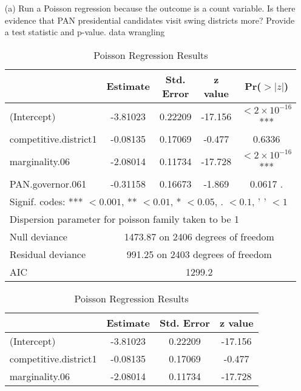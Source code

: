 \documentclass[12pt,letterpaper]{article}
\begin{document}
\begin{enumerate}
	\item [(a)]
	Run a Poisson regression because the outcome is a count variable. Is there evidence that PAN presidential candidates visit swing districts more? Provide a test statistic and p-value.
	data wrangling
	
	 
	\begin{table}[htbp]
		\centering
		\caption{Poisson Regression Results}
		\begin{tabular}{lcccc}
			\toprule
			& \textbf{Estimate} & \textbf{Std. Error} & \textbf{z value} & \textbf{Pr($>|z|$)} \\
			\midrule
			(Intercept) & -3.81023 & 0.22209 & -17.156 & $<2 \times 10^{-16}$ *** \\
			competitive.district1 & -0.08135 & 0.17069 & -0.477 & 0.6336 \\
			marginality.06 & -2.08014 & 0.11734 & -17.728 & $<2 \times 10^{-16}$ *** \\
			PAN.governor.061 & -0.31158 & 0.16673 & -1.869 & 0.0617 . \\
			\midrule
			\multicolumn{5}{l}{Signif. codes: *** $<0.001$, ** $<0.01$, * $<0.05$, . $<0.1$, ' ' $<1$} \\
			\midrule
			\multicolumn{5}{l}{Dispersion parameter for poisson family taken to be 1} \\
			\midrule
			Null deviance & \multicolumn{4}{c}{1473.87 on 2406 degrees of freedom} \\
			Residual deviance & \multicolumn{4}{c}{991.25 on 2403 degrees of freedom} \\
			AIC & \multicolumn{4}{c}{1299.2} \\
			\bottomrule
		\end{tabular}
		\label{tab:poisson_regression_results}
	\end{table}
		 
	\begin{table}[htbp]
		\centering
		\caption{Poisson Regression Results}
		\begin{tabular}{lccc}
			\toprule
			& \textbf{Estimate} & \textbf{Std. Error} & \textbf{z value} \\
			\midrule
			(Intercept) & -3.81023 & 0.22209 & -17.156 \\
			competitive.district1 & -0.08135 & 0.17069 & -0.477 \\
			marginality.06 & -2.08014 & 0.11734 & -17.728 \\

\end{tabular}
\end{table}
\end{enumerate}
\end{document}
